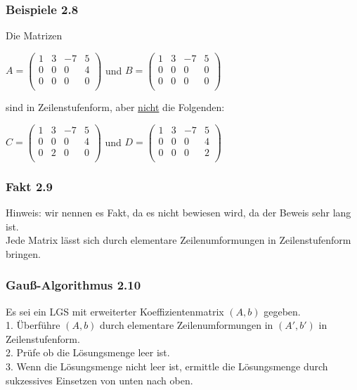 \documentclass{article}
\begin{document}
\subsubsection*{Beispiele 2.8}
Die Matrizen 
\begin{center}
    $A = \begin{pmatrix}
        1 & 3 & -7 & 5 \\
        0 & 0 & 0 & 4 \\
        0 & 0 & 0 & 0 \\
    \end{pmatrix}$ und
    $B = \begin{pmatrix}
        1 & 3 & -7 & 5 \\
        0 & 0 & 0 & 0 \\
        0 & 0 & 0 & 0 \\
    \end{pmatrix}$
\end{center}
sind in Zeilenstufenform, aber \underline{nicht} die Folgenden: \\
\begin{center}
    $C = \begin{pmatrix}
        1 & 3 & -7 & 5 \\
        0 & 0 & 0 & 4 \\
        0 & 2 & 0 & 0 \\
    \end{pmatrix}$ und
    $D = \begin{pmatrix}
        1 & 3 & -7 & 5 \\
        0 & 0 & 0 & 4 \\
        0 & 0 & 0 & 2 \\
    \end{pmatrix}$
\end{center}

\subsubsection*{Fakt 2.9}
Hinweis: wir nennen es Fakt, da es nicht bewiesen wird, da der Beweis sehr lang ist. \\
Jede Matrix lässt sich durch elementare Zeilenumformungen in Zeilenstufenform bringen. \\

\subsubsection*{Gauß-Algorithmus 2.10}
Es sei ein LGS mit erweiterter Koeffizientenmatrix $(A,b)$ gegeben. \\
1. Überführe $(A,b)$ durch elementare Zeilenumformungen in $(A',b')$ in Zeilenstufenform. \\
2. Prüfe ob die Lösungsmenge leer ist. \\
3. Wenn die Lösungsmenge nicht leer ist, ermittle die Lösungsmenge durch sukzessives Einsetzen von unten nach oben. \\
\\
\end{document}
